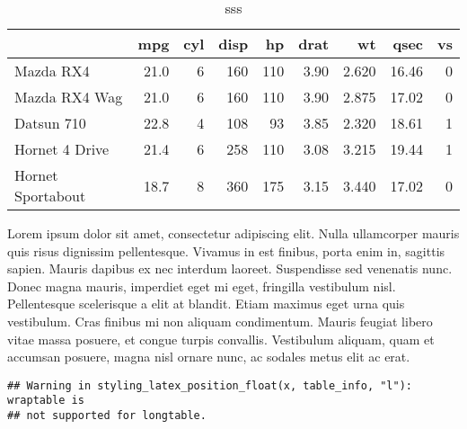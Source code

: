 \documentclass[]{article}
\newenvironment{Shaded}{\begin{snugshade}}{\end{snugshade}}
\newcommand{\KeywordTok}[1]{\textcolor[rgb]{0.13,0.29,0.53}{\textbf{{#1}}}}
\newcommand{\DataTypeTok}[1]{\textcolor[rgb]{0.13,0.29,0.53}{{#1}}}
\newcommand{\DecValTok}[1]{\textcolor[rgb]{0.00,0.00,0.81}{{#1}}}
\newcommand{\StringTok}[1]{\textcolor[rgb]{0.31,0.60,0.02}{{#1}}}
\newcommand{\NormalTok}[1]{{#1}}
\begin{document}
\begin{wraptable}{l}{12.45cm}

\caption{\label{tab:unnamed-chunk-6}sss}
\centering
\fontsize{6}{8}\selectfont
\begin{tabular}[t]{lrrrrrrrr}
\toprule
  & mpg & cyl & disp & hp & drat & wt & qsec & vs\\
\midrule
Mazda RX4 & 21.0 & 6 & 160 & 110 & 3.90 & 2.620 & 16.46 & 0\\
Mazda RX4 Wag & 21.0 & 6 & 160 & 110 & 3.90 & 2.875 & 17.02 & 0\\
Datsun 710 & 22.8 & 4 & 108 & 93 & 3.85 & 2.320 & 18.61 & 1\\
Hornet 4 Drive & 21.4 & 6 & 258 & 110 & 3.08 & 3.215 & 19.44 & 1\\
Hornet Sportabout & 18.7 & 8 & 360 & 175 & 3.15 & 3.440 & 17.02 & 0\\
\bottomrule
\end{tabular}
\end{wraptable}


Lorem ipsum dolor sit amet, consectetur adipiscing elit. Nulla
ullamcorper mauris quis risus dignissim pellentesque. Vivamus in est
finibus, porta enim in, sagittis sapien. Mauris dapibus ex nec interdum
laoreet. Suspendisse sed venenatis nunc. Donec magna mauris, imperdiet
eget mi eget, fringilla vestibulum nisl. Pellentesque scelerisque a elit
at blandit. Etiam maximus eget urna quis vestibulum. Cras finibus mi non
aliquam condimentum. Mauris feugiat libero vitae massa posuere, et
congue turpis convallis. Vestibulum aliquam, quam et accumsan posuere,
magna nisl ornare nunc, ac sodales metus elit ac erat.

\begin{Shaded}
\end{Shaded}

\begin{verbatim}
## Warning in styling_latex_position_float(x, table_info, "l"): wraptable is
## not supported for longtable.
\end{verbatim}
\end{document}
